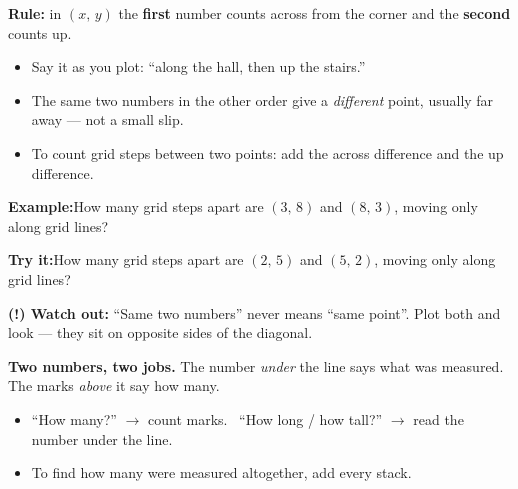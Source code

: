 \documentclass[12pt]{article}
\begin{document}


\begin{formulabox}
\textbf{Rule:} in $(x,\,y)$ the \textbf{first} number counts across from the
corner and the \textbf{second} counts up.
\begin{itemize}[leftmargin=0.8cm, itemsep=1pt, topsep=2pt]
  \item Say it as you plot: ``along the hall, then up the stairs.''
  \item The same two numbers in the other order give a \emph{different} point,
        usually far away --- not a small slip.
  \item To count grid steps between two points: add the across difference and
        the up difference.
\end{itemize}
\end{formulabox}

\begin{examplebox}
\textbf{Example:}\quad How many grid steps apart are $(3,\,8)$ and $(8,\,3)$,
moving only along grid lines?
\end{examplebox}

\begin{tryitbox}
\textbf{Try it:}\quad How many grid steps apart are $(2,\,5)$ and $(5,\,2)$,
moving only along grid lines?\\[2pt]
\end{tryitbox}

\begin{watchoutbox}
\textbf{(!) Watch out:} ``Same two numbers'' never means ``same point''. Plot
both and look --- they sit on opposite sides of the diagonal.
\end{watchoutbox}


\begin{formulabox}
\textbf{Two numbers, two jobs.} The number \emph{under} the line says what was
measured. The marks \emph{above} it say how many.
\begin{itemize}[leftmargin=0.8cm, itemsep=1pt, topsep=2pt]
  \item ``How many?'' $\rightarrow$ count marks. \ ``How long / how tall?''
        $\rightarrow$ read the number under the line.
  \item To find how many were measured altogether, add every stack.
\end{itemize}
\end{formulabox}
\end{document}
